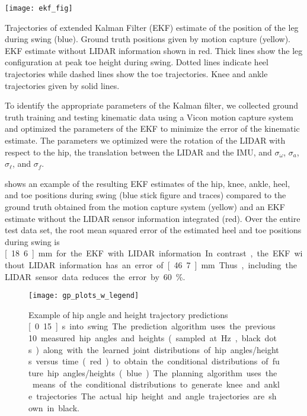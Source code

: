 \begin{marginfigure}[-1in]
    \centering
    \texttt{[image: ekf\_fig]}
    \caption[Trajectories of extended Kalman Filter (EKF) estimate of the
    position of the leg during swing compared to ground truth data from motion
    capture system]{Trajectories of extended Kalman Filter (EKF) estimate of the
    position of the leg during swing (blue). Ground truth positions given by
    motion capture (yellow). EKF estimate without LIDAR information shown in
    red. Thick lines show the leg configuration at peak toe height during swing.
    Dotted lines indicate heel trajectories while dashed lines show the toe
    trajectories. Knee and ankle trajectories given by solid
    lines.}\label{fig:ekf}
\end{marginfigure}

To identify the appropriate parameters of the Kalman filter, we collected ground
truth training and testing kinematic data using a Vicon motion capture system
and optimized the parameters of the EKF to minimize the error of the kinematic
estimate. The parameters we optimized were the rotation of the LIDAR with
respect to the hip, the translation between the LIDAR and the IMU, and
$\sigma_\omega$, $\sigma_a$, $\sigma_\ell$, and $\sigma_f$. 

 shows an example of the resulting EKF estimates of the hip, knee,
ankle, heel, and toe positions during swing (blue stick figure and traces)
compared to the ground truth obtained from the motion capture system (yellow)
and an EKF estimate without the LIDAR sensor information integrated (red). Over
the entire test data set, the root mean squared error of the estimated heel and
toe positions during swing is \unit[18.6]{mm} for the EKF with LIDAR
information. In contrast, the EKF without LIDAR information has an error of
\unit[46.7]{mm}. Thus, including the LIDAR sensor data reduces the error by
60\%.

\begin{figure}[t]
    \centering
    \texttt{[image: gp\_plots\_w\_legend]}
    \caption[Example of hip angle and height trajectory predictions]{Example of
    hip angle and height trajectory predictions \unit[0.15]{s} into swing. The
    prediction algorithm uses the previous 10 measured hip angles and heights
    (sampled at \unit[100]{Hz}, black dots) along with the learned joint
    distributions of hip angles/heights versus time (red) to obtain the
    conditional distributions of future hip angles/heights (blue). The planning
    algorithm uses the means of the conditional distributions to generate knee
    and ankle trajectories. The actual hip height and angle trajectories are
    shown in black.}\label{fig:gp_plots}
\end{figure}
